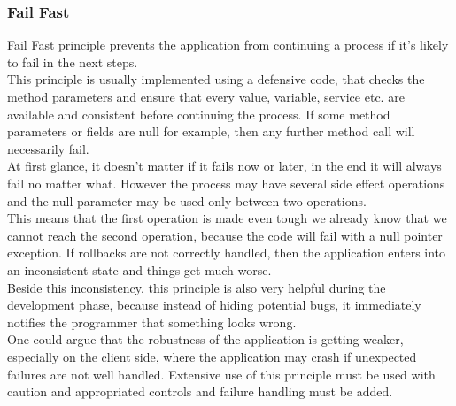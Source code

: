 \subsubsection{Fail Fast}
Fail Fast principle prevents the application from continuing a process if
it's likely to fail in the next steps. \\
\newline
This principle is usually implemented using a defensive code, that checks
the method parameters and ensure that every value, variable, service etc.
are available and consistent before continuing the process.
If some method parameters or fields are null for example, then any
further method call will necessarily fail. \\
\newline
At first glance, it doesn't matter if it fails now or later, in the end
it will always fail no matter what.
However the process may have several side effect operations and the null
parameter may be used only between two operations. \\
This means that the first operation is made even tough we already know
that we cannot reach the second operation, because the code will fail
with a null pointer exception.
If rollbacks are not correctly handled, then the application enters into
an inconsistent state and things get much worse. \\
\newline
Beside this inconsistency, this principle is also very helpful during
the development phase, because instead of hiding potential bugs, it
immediately notifies the programmer that something looks wrong. \\
One could argue that the robustness of the application is getting
weaker, especially on the client side, where the application may crash
if unexpected failures are not well handled.
Extensive use of this principle must be used with caution and
appropriated controls and failure handling must be added.

